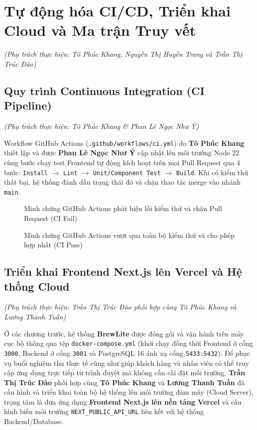 \section{Tự động hóa CI/CD, Triển khai Cloud và Ma trận Truy vết}
\textit{(Phụ trách thực hiện: Tô Phúc Khang, Nguyễn Thị Huyền Trang và Trần Thị Trúc Đào)}

\subsection{Quy trình Continuous Integration (CI Pipeline)}
\textit{(Phụ trách thực hiện: Tô Phúc Khang \& Phan Lê Ngọc Như Ý)}

Workflow GitHub Actions (\texttt{.github/workflows/ci.yml}) do \textbf{Tô Phúc Khang} thiết lập và được \textbf{Phan Lê Ngọc Như Ý} cập nhật lên môi trường Node 22 cùng bước chạy test Frontend tự động kích hoạt trên mọi Pull Request qua 4 bước: \texttt{Install} $\rightarrow$ \texttt{Lint} $\rightarrow$ \texttt{Unit/Component Test} $\rightarrow$ \texttt{Build}. Khi có kiểm thử thất bại, hệ thống đánh dấu trạng thái đỏ và chặn thao tác merge vào nhánh \texttt{main}.

\begin{figure}[H]
\centering
{}
\caption{Minh chứng GitHub Actions phát hiện lỗi kiểm thử và chặn Pull Request (CI Fail)}
\end{figure}

\begin{figure}[H]
\centering
{}
\caption{Minh chứng GitHub Actions vượt qua toàn bộ kiểm thử và cho phép hợp nhất (CI Pass)}
\end{figure}

\subsection{Triển khai Frontend Next.js lên Vercel và Hệ thống Cloud}
\textit{(Phụ trách thực hiện: Trần Thị Trúc Đào phối hợp cùng Tô Phúc Khang và Lương Thanh Tuấn)}

Ở các chương trước, hệ thống \textbf{BrewLite} được đóng gói và vận hành trên máy cục bộ thông qua tệp \texttt{docker-compose.yml} (khởi chạy đồng thời Frontend ở cổng \texttt{3000}, Backend ở cổng \texttt{3001} và PostgreSQL 16 ánh xạ cổng \texttt{5433:5432}). Để phục vụ buổi nghiệm thu thực tế cũng như giúp khách hàng và nhân viên có thể truy cập ứng dụng trực tiếp từ trình duyệt mà không cần cài đặt môi trường, \textbf{Trần Thị Trúc Đào} phối hợp cùng \textbf{Tô Phúc Khang} và \textbf{Lương Thanh Tuấn} đã cấu hình và triển khai toàn bộ hệ thống lên môi trường đám mây (Cloud Server), trọng tâm là đưa ứng dụng \textbf{Frontend Next.js lên nền tảng Vercel} và cấu hình biến môi trường \texttt{NEXT\_PUBLIC\_API\_URL} liên kết với hệ thống Backend/Database.

